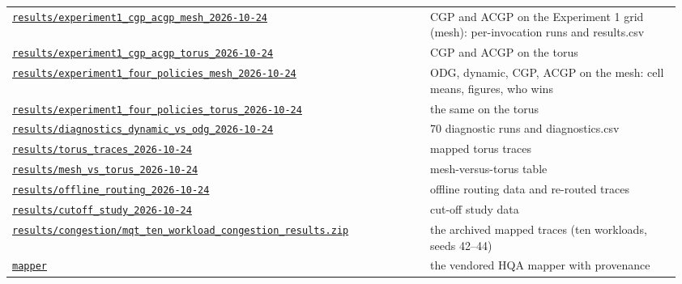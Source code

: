 {\begin{longtable}{@{}p{0.60\linewidth}p{0.36\linewidth}@{}}
\href{https://github.com/sanjeevkrishnaa/Compiler-Driven-ACE/tree/codex/ace-scheduler-correctness/results/experiment1_cgp_acgp_mesh_2026-10-24}{\nolinkurl{results/experiment1_cgp_acgp_mesh_2026-10-24}} & CGP and ACGP on the Experiment 1 grid (mesh): per-invocation runs and results.csv \\
\href{https://github.com/sanjeevkrishnaa/Compiler-Driven-ACE/tree/codex/ace-scheduler-correctness/results/experiment1_cgp_acgp_torus_2026-10-24}{\nolinkurl{results/experiment1_cgp_acgp_torus_2026-10-24}} & CGP and ACGP on the torus \\
\href{https://github.com/sanjeevkrishnaa/Compiler-Driven-ACE/tree/codex/ace-scheduler-correctness/results/experiment1_four_policies_mesh_2026-10-24}{\nolinkurl{results/experiment1_four_policies_mesh_2026-10-24}} & ODG, dynamic, CGP, ACGP on the mesh: cell means, figures, who wins \\
\href{https://github.com/sanjeevkrishnaa/Compiler-Driven-ACE/tree/codex/ace-scheduler-correctness/results/experiment1_four_policies_torus_2026-10-24}{\nolinkurl{results/experiment1_four_policies_torus_2026-10-24}} & the same on the torus \\
\href{https://github.com/sanjeevkrishnaa/Compiler-Driven-ACE/tree/codex/ace-scheduler-correctness/results/diagnostics_dynamic_vs_odg_2026-10-24}{\nolinkurl{results/diagnostics_dynamic_vs_odg_2026-10-24}} & 70 diagnostic runs and diagnostics.csv \\
\href{https://github.com/sanjeevkrishnaa/Compiler-Driven-ACE/tree/codex/ace-scheduler-correctness/results/torus_traces_2026-10-24}{\nolinkurl{results/torus_traces_2026-10-24}} & mapped torus traces \\
\href{https://github.com/sanjeevkrishnaa/Compiler-Driven-ACE/tree/codex/ace-scheduler-correctness/results/mesh_vs_torus_2026-10-24}{\nolinkurl{results/mesh_vs_torus_2026-10-24}} & mesh-versus-torus table \\
\href{https://github.com/sanjeevkrishnaa/Compiler-Driven-ACE/tree/codex/ace-scheduler-correctness/results/offline_routing_2026-10-24}{\nolinkurl{results/offline_routing_2026-10-24}} & offline routing data and re-routed traces \\
\href{https://github.com/sanjeevkrishnaa/Compiler-Driven-ACE/tree/codex/ace-scheduler-correctness/results/cutoff_study_2026-10-24}{\nolinkurl{results/cutoff_study_2026-10-24}} & cut-off study data \\
\href{https://github.com/sanjeevkrishnaa/Compiler-Driven-ACE/blob/codex/ace-scheduler-correctness/results/congestion/mqt_ten_workload_congestion_results.zip}{\nolinkurl{results/congestion/mqt_ten_workload_congestion_results.zip}} & the archived mapped traces (ten workloads, seeds 42–44) \\
\href{https://github.com/sanjeevkrishnaa/Compiler-Driven-ACE/tree/codex/ace-scheduler-correctness/mapper}{\nolinkurl{mapper}} & the vendored HQA mapper with provenance \\
\end{longtable}
}
